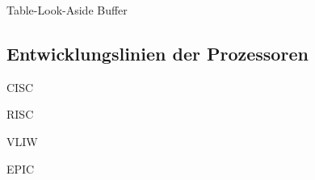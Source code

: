 \begin{defi}{Table-Look-Aside Buffer}

\end{defi}

\subsection{Entwicklungslinien der Prozessoren}

\begin{defi}{CISC}

\end{defi}

\begin{defi}{RISC}

\end{defi}

\begin{defi}{VLIW}

\end{defi}

\begin{defi}{EPIC}

\end{defi}